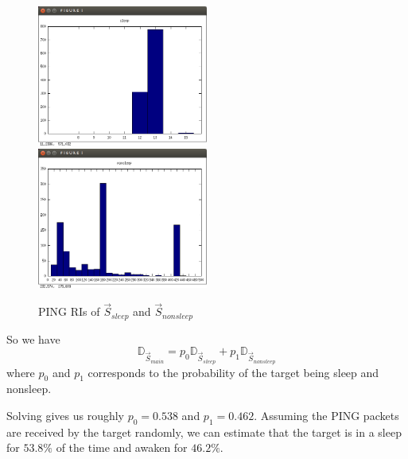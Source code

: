 \begin{example}
\begin{figure}
\includegraphics[width=0.5\textwidth]{fig/d_sleep.png}
\includegraphics[width=0.5\textwidth]{fig/d_nonsleep.png}
\caption{PING RIs of $\vec{S}_{sleep}$ and $\vec{S}_{nonsleep}$}
\label{Fig: s_sleep and s_nonsleep}
\end{figure}

So we have
\begin{equation} \label{Eq: sleep}
\mathbb{D}_{\vec{S}_{main}} = p_0 \mathbb{D}_{\vec{S}_{sleep}} + p_1 \mathbb{D}_{\vec{S}_{nonsleep}}
\end{equation}
where $p_0$ and $p_1$ corresponds to the probability of the target being sleep and nonsleep.

Solving  gives us roughly $p_0 = 0.538$ and $p_1 = 0.462$. Assuming the PING packets are received by the target randomly, we can estimate that the target is in a sleep for $53.8\%$ of the time and awaken for $46.2\%$.
\end{example}